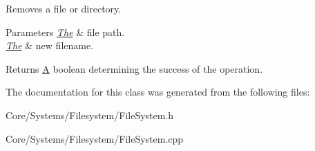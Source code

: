 Removes a file or directory. 


\begin{DoxyParams}{Parameters}
{\em \hyperlink{classThe}{The}} & file path. \\
\hline
{\em \hyperlink{classThe}{The}} & new filename. \\
\hline
\end{DoxyParams}
\begin{DoxyReturn}{Returns}
\hyperlink{classA}{A} boolean determining the success of the operation. 
\end{DoxyReturn}


The documentation for this class was generated from the following files\-:\begin{DoxyCompactItemize}
\item 
Core/\-Systems/\-Filesystem/File\-System.\-h\item 
Core/\-Systems/\-Filesystem/File\-System.\-cpp\end{DoxyCompactItemize}
